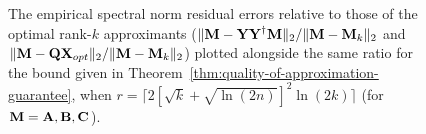\begin{figure}
 \centering
 \caption{The empirical spectral norm residual errors relative to those of the optimal rank-$k$ approximants ($\mbox{}\|{\bm{\mathrm{M}}} - {\bm{\mathrm{Y}}}{\bm{\mathrm{Y}}}^\dagger {\ensuremath{\bm{\mathrm{M}}}}\|_2/\mbox{}\|{\bm{\mathrm{M}}} - {\bm{\mathrm{M}}}_k\|_2$ and $\mbox{}\|{\bm{\mathrm{M}}} - {\bm{\mathrm{Q}}}{\bm{\mathrm{X}}}_{opt}\|_2/\mbox{}\|{\bm{\mathrm{M}}} - {\bm{\mathrm{M}}}_k\|_2$) plotted alongside the same ratio for the bound given in Theorem~\ref{thm:quality-of-approximation-guarantee}, when $r = \lceil 2[\sqrt{k} + \sqrt{\ln(2n)}]^2 \ln(2k) \rceil$ (for ${\bm{\mathrm{M}}} = {\bm{\mathrm{A}}}, {\bm{\mathrm{B}}}, {\bm{\mathrm{C}}}$).}
 \label{fig:predictedspecerrvsactual}
\end{figure}

